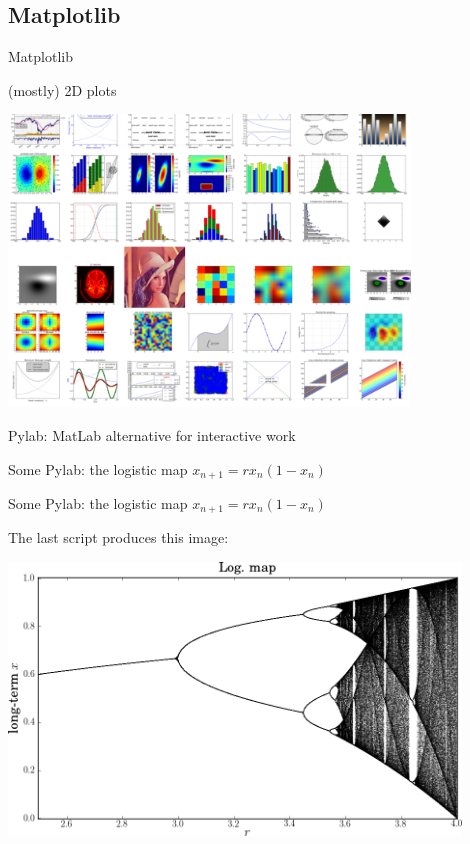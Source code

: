 \subsection{Matplotlib}

\begin{frame}{Matplotlib}

(mostly) 2D plots

\begin{center}
\includegraphics[width=0.8\textwidth]{Figures/mpl}
\end{center}

Pylab: MatLab alternative for interactive work
\end{frame}


\begin{frame}{Some Pylab: the logistic map $x_{n+1}= rx_n(1-x_n)$}

\end{frame}

\begin{frame}{Some Pylab: the logistic map $x_{n+1}= rx_n(1-x_n)$}

The last script produces this image:

\begin{center}
	\includegraphics[width=0.9\textwidth]{Figures/logMap}
\end{center}

\end{frame}
